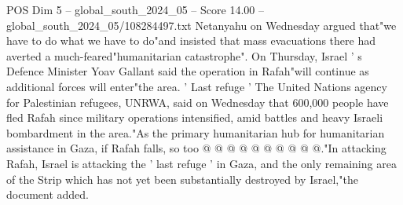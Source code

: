 \begin{textsample}{POS Dim 5 – global\_south\_2024\_05 – Score 14.00 – global\_south\_2024\_05/108284497.txt}
Netanyahu on Wednesday argued that"we have to do what we have to do"and insisted that mass evacuations there had averted a much-feared"humanitarian catastrophe".
On Thursday, Israel ' s Defence Minister Yoav Gallant said the operation in Rafah"will continue as additional forces will enter"the area. ' Last refuge ' The United Nations agency for Palestinian refugees, UNRWA, said on Wednesday that 600,000 people have fled Rafah since military operations intensified, amid battles and heavy Israeli bombardment in the area."As the primary humanitarian hub for humanitarian assistance in Gaza, if Rafah falls, so too @ @ @ @ @ @ @ @ @ @."In attacking Rafah, Israel is attacking the ' last refuge ' in Gaza, and the only remaining area of the Strip which has not yet been substantially destroyed by Israel,"the document added.

\end{textsample}
